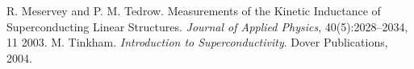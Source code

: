 
\begin{thebibliography}{}
 R. Meservey and P. M. Tedrow. Measurements of the Kinetic Inductance of Superconducting Linear Structures. \textit{Journal of Applied Physics}, 40(5):2028–2034, 11 2003.
 M. Tinkham. \textit{Introduction to Superconductivity}. Dover Publications, 2004.
\end{thebibliography}